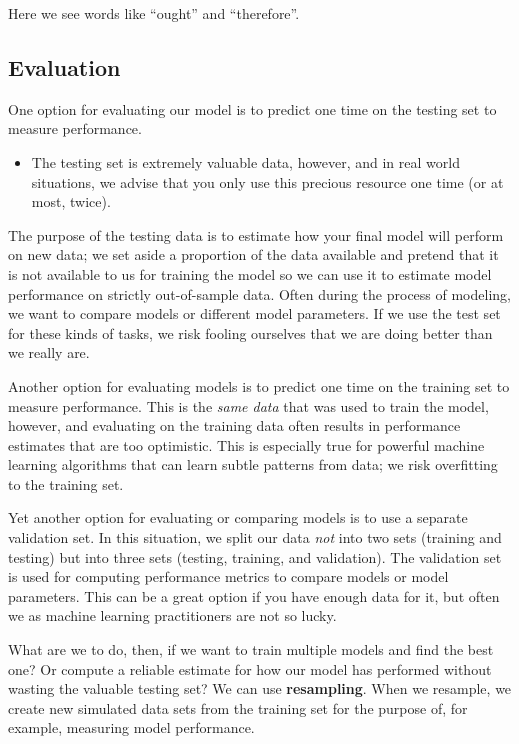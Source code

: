 \documentclass[
]{krantz}
\newenvironment{rmdblock}[1]
  {\begin{shaded*}
  \begin{itemize}[left = -1cm, labelsep = 1cm]
  \renewcommand{\labelitemi}{
    \raisebox{-.7\height}[0pt][0pt]{
      {\setkeys{Gin}{width=3em,keepaspectratio}\texttt{[image: images/\#1]}}
    }
  }
 
  \item
  }
  {
  \end{itemize}
  \end{shaded*}
  }
\newenvironment{rmdwarning}
  {\begin{rmdblock}{warning}}
  {\end{rmdblock}}
\begin{document}
Here we see words like ``ought'' and ``therefore''.

\hypertarget{firstregressionevaluation}{%
\subsection{Evaluation}\label{firstregressionevaluation}}

One option for evaluating our model is to predict one time on the testing set to measure performance.

\begin{rmdwarning}
The testing set is extremely valuable data, however, and in real world
situations, we advise that you only use this precious resource one time
(or at most, twice).
\end{rmdwarning}

The purpose of the testing data is to estimate how your final model will perform on new data; we set aside a proportion of the data available and pretend that it is not available to us for training the model so we can use it to estimate model performance on strictly out-of-sample data. Often during the process of modeling, we want to compare models or different model parameters. If we use the test set for these kinds of tasks, we risk fooling ourselves that we are doing better than we really are.

Another option for evaluating models is to predict one time on the training set to measure performance. This is the \emph{same data} that was used to train the model, however, and evaluating on the training data often results in performance estimates that are too optimistic. This is especially true for powerful machine learning algorithms that can learn subtle patterns from data; we risk overfitting to the training set.

Yet another option for evaluating or comparing models is to use a separate validation set. In this situation, we split our data \emph{not} into two sets (training and testing) but into three sets (testing, training, and validation). The validation set is used for computing performance metrics to compare models or model parameters. This can be a great option if you have enough data for it, but often we as machine learning practitioners are not so lucky.

What are we to do, then, if we want to train multiple models and find the best one? Or compute a reliable estimate for how our model has performed without wasting the valuable testing set? We can use \textbf{resampling}. When we resample, we create new simulated data sets from the training set for the purpose of, for example, measuring model performance.
\end{document}

